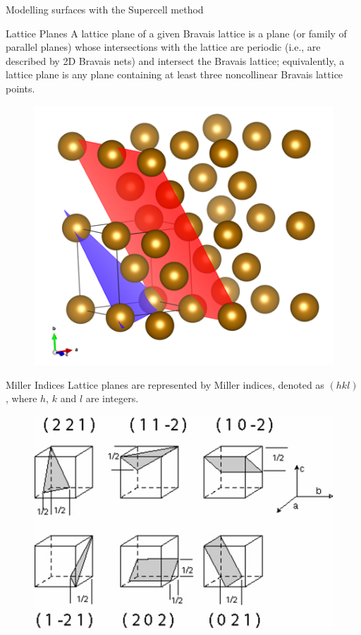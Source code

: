 \documentclass[aspectratio=169]{beamer}
\begin{document}
\begin{frame}{Modelling surfaces with the Supercell method}

\begin{figure}
    \centering
{}
\end{figure}

\end{frame} 


\begin{frame}{Lattice Planes}
A lattice plane of a given Bravais lattice is a plane (or family of parallel planes) whose intersections with the lattice are periodic (i.e., are described by 2D Bravais nets) and intersect the Bravais lattice; equivalently, a lattice plane is any plane containing at least three noncollinear Bravais lattice points.
\begin{figure}
    \centering
    \includegraphics[width=0.3\linewidth]{lectures/figures/11_lattice_planes.png}
\end{figure} 
\end{frame} 

\begin{frame}{Miller Indices}
Lattice planes are represented by Miller indices, denoted as $(hkl)$, where $h$, $k$ and $l$ are integers. 
\begin{figure}
    \centering
    \includegraphics[width=0.5\linewidth]{lectures/figures/11_miller_indices.png}
\end{figure} 
\end{frame}
\end{document}
